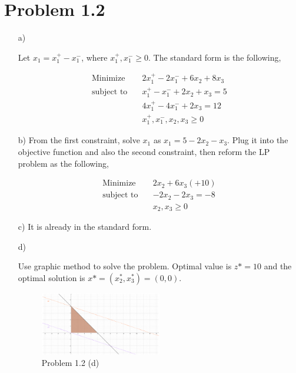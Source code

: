\documentclass[12pt]{article}
\begin{document}
\section*{Problem 1.2}
\begin{enumerate}
\item[a)]

Let $x_1 = x_1^+ - x_1^-$, where $x_1^+, x_1^- \geqslant 0$. The standard form is the following,

\begin{equation*}
\begin{aligned}
\text{Minimize} \quad & 2x_1^+ - 2x_1^- + 6x_2 + 8x_3 \\
\text{subject\  to} \quad & x_1^+ - x_1^- + 2x_2 + x_3 = 5 \\
& 4x_1^+ - 4x_1^-  + 2x_3 = 12\\
& x_1^+, x_1^-, x_2, x_3 \geqslant 0
\end{aligned}
\end{equation*}

\item[b)]
From the first constraint, solve $x_1$ as $x_1 = 5 - 2x_2 - x_3$. Plug it into the objective function and also the second constraint, then reform the LP problem as the following,

\begin{equation*}
\begin{aligned}
\text{Minimize} \quad & 2x_2 + 6x_3 (+10)\\
\text{subject\  to} \quad & -2x_2 - 2x_3 = -8 \\
& x_2, x_3 \geqslant 0
\end{aligned}
\end{equation*}

\item[c)]
It is already in the standard form.

\item[d)]

Use graphic method to solve the problem. Optimal value is $z* = 10$ and the optimal solution is $x* = (x_2^*, x_3^*) = (0, 0)$.

\FloatBarrier

\begin{figure}[htpb]
  \caption{Problem 1.2 (d)}
  \centering
    \includegraphics[width=0.5\textwidth]{fig1.pdf}
\end{figure}

\FloatBarrier



\end{enumerate}
\end{document}
